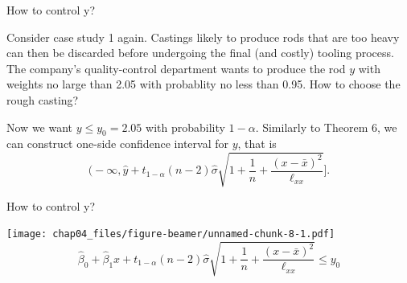 \documentclass[ignorenonframetext,]{beamer}
\begin{document}
\begin{frame}{How to control y?}
\protect\hypertarget{how-to-control-y}{}

Consider case study 1 again. Castings likely to produce rods that are
too heavy can then be discarded before undergoing the final (and costly)
tooling process. The company's quality-control department wants to
produce the rod \(y\) with weights no large than 2.05 with probablity no
less than 0.95. How to choose the rough casting?

Now we want \(y\le y_0=2.05\) with probability \(1-\alpha\). Similarly
to Theorem 6, we can construct one-side confidence interval for \(y\),
that is
\[\bigg(-\infty,\hat y+t_{1-\alpha}(n-2)\hat{\sigma}\sqrt{1+\frac{1}{n}+\frac{(x-\bar x)^2}{\ell_{xx}}}\bigg].\]

\end{frame}

\begin{frame}{How to control y?}
\protect\hypertarget{how-to-control-y-1}{}

\texttt{[image: chap04\_files/figure-beamer/unnamed-chunk-8-1.pdf]}
\[\hat\beta_0+\hat\beta_1x+t_{1-\alpha}(n-2)\hat{\sigma}\sqrt{1+\frac{1}{n}+\frac{(x-\bar x)^2}{\ell_{xx}}}\le y_0\]

\end{frame}
\end{document}

